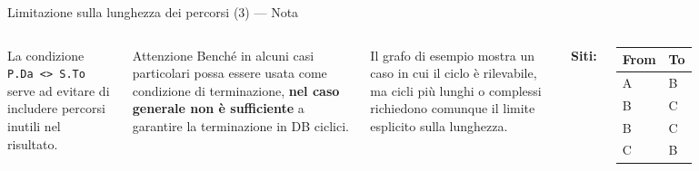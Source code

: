 \documentclass[aspectratio=169]{beamer}
\begin{document}
\begin{frame}{Limitazione sulla lunghezza dei percorsi (3) — Nota}

\begin{columns}[T]
La condizione \texttt{P.Da <> S.To} serve ad evitare di includere percorsi inutili nel risultato.

\vspace{8pt}
\begin{alertblock}{Attenzione}
Benché in alcuni casi particolari possa essere usata come condizione di terminazione, \textbf{nel caso generale non è sufficiente} a garantire la terminazione in DB ciclici.
\end{alertblock}

\vspace{8pt}
Il grafo di esempio mostra un caso in cui il ciclo è rilevabile, ma cicli più lunghi o complessi richiedono comunque il limite esplicito sulla lunghezza.

\textbf{Siti:}\\[6pt]
\small
\begin{tabular}{|l|l|}
\hline
\textbf{From} & \textbf{To}\\
\hline
A & B \\
B & C \\
B & C \\
C & B \\
\hline
\end{tabular}

\vspace{10pt}
\end{columns}

\end{frame}
\end{document}
